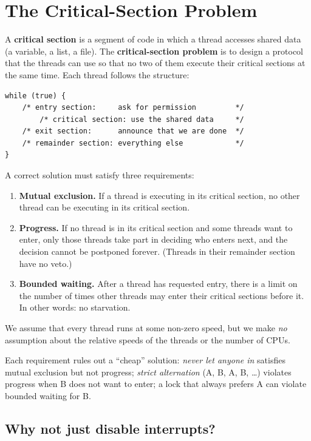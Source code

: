 \documentclass[11pt,a4paper]{article}
\newcommand{\term}[1]{\textbf{\color{mintdeep}#1}}
\begin{document}
\section{The Critical-Section Problem}
\label{sec:cs}

A \term{critical section} is a segment of code in which a thread accesses shared data (a variable, a list, a file). The \term{critical-section problem} is to design a protocol that the threads can use so that no two of them execute their critical sections at the same time. Each thread follows the structure:

\begin{lstlisting}
while (true) {
    /* entry section:     ask for permission         */
        /* critical section: use the shared data     */
    /* exit section:      announce that we are done  */
    /* remainder section: everything else            */
}
\end{lstlisting}

A correct solution must satisfy three requirements:
\begin{enumerate}[leftmargin=1.4em]
  \item \textbf{Mutual exclusion.} If a thread is executing in its critical section, no other thread can be executing in its critical section.
  \item \textbf{Progress.} If no thread is in its critical section and some threads want to enter, only those threads take part in deciding who enters next, and the decision cannot be postponed forever. (Threads in their remainder section have no veto.)
  \item \textbf{Bounded waiting.} After a thread has requested entry, there is a limit on the number of times other threads may enter their critical sections before it. In other words: no starvation.
\end{enumerate}
We assume that every thread runs at some non-zero speed, but we make \emph{no} assumption about the relative speeds of the threads or the number of CPUs.

Each requirement rules out a ``cheap'' solution: \emph{never let anyone in} satisfies mutual exclusion but not progress; \emph{strict alternation} (A, B, A, B, \dots) violates progress when B does not want to enter; a lock that always prefers A can violate bounded waiting for B.

\subsection{Why not just disable interrupts?}
\end{document}
